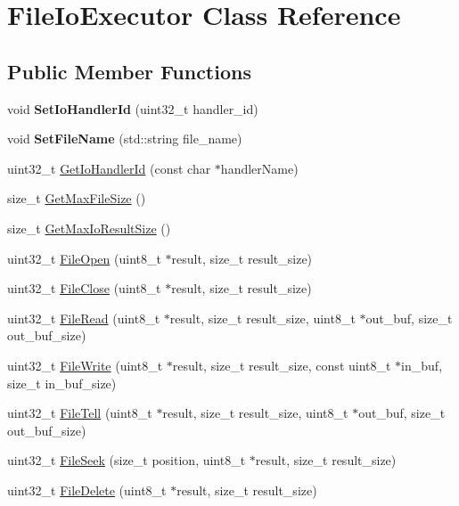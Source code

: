 \hypertarget{classFileIoExecutor}{}\section{File\+Io\+Executor Class Reference}
\label{classFileIoExecutor}
\subsection*{Public Member Functions}
\begin{DoxyCompactItemize}
\item 
\mbox{\label{classFileIoExecutor_aa6cb0dfebb0c8c2c3b868939ffdbd940}} 
void {\bfseries Set\+Io\+Handler\+Id} (uint32\+\_\+t handler\+\_\+id)
\item 
\mbox{\label{classFileIoExecutor_a65a2dc7df4a3865b1763e7cec974d50a}} 
void {\bfseries Set\+File\+Name} (std\+::string file\+\_\+name)
\item 
uint32\+\_\+t \hyperlink{classFileIoExecutor_a364a598bf9a247e102b67e52e2a45da1}{Get\+Io\+Handler\+Id} (const char $\ast$handler\+Name)
\item 
size\+\_\+t \hyperlink{classFileIoExecutor_a8ca473e3e64e7e2a20d41247fdedd76a}{Get\+Max\+File\+Size} ()
\item 
size\+\_\+t \hyperlink{classFileIoExecutor_aed7849bb739d14cb2cd4d011d5fb1828}{Get\+Max\+Io\+Result\+Size} ()
\item 
uint32\+\_\+t \hyperlink{classFileIoExecutor_a36cbe68b508f084de8f76a88797ce670}{File\+Open} (uint8\+\_\+t $\ast$result, size\+\_\+t result\+\_\+size)
\item 
uint32\+\_\+t \hyperlink{classFileIoExecutor_aebfb27eafb883fd43b4829011b7b451d}{File\+Close} (uint8\+\_\+t $\ast$result, size\+\_\+t result\+\_\+size)
\item 
uint32\+\_\+t \hyperlink{classFileIoExecutor_ab0b3510df933d83fff527ad3385e6c35}{File\+Read} (uint8\+\_\+t $\ast$result, size\+\_\+t result\+\_\+size, uint8\+\_\+t $\ast$out\+\_\+buf, size\+\_\+t out\+\_\+buf\+\_\+size)
\item 
uint32\+\_\+t \hyperlink{classFileIoExecutor_a961b3eb58f78085045a4631d148188a6}{File\+Write} (uint8\+\_\+t $\ast$result, size\+\_\+t result\+\_\+size, const uint8\+\_\+t $\ast$in\+\_\+buf, size\+\_\+t in\+\_\+buf\+\_\+size)
\item 
uint32\+\_\+t \hyperlink{classFileIoExecutor_a7fae38b5e3c5b824983d4768edda94a6}{File\+Tell} (uint8\+\_\+t $\ast$result, size\+\_\+t result\+\_\+size, uint8\+\_\+t $\ast$out\+\_\+buf, size\+\_\+t out\+\_\+buf\+\_\+size)
\item 
uint32\+\_\+t \hyperlink{classFileIoExecutor_af27e670b49606c8ddba1f5172a26ce94}{File\+Seek} (size\+\_\+t position, uint8\+\_\+t $\ast$result, size\+\_\+t result\+\_\+size)
\item 
uint32\+\_\+t \hyperlink{classFileIoExecutor_a78b681e94e8a568bb8981ce6eb1fac62}{File\+Delete} (uint8\+\_\+t $\ast$result, size\+\_\+t result\+\_\+size)
\end{DoxyCompactItemize}


